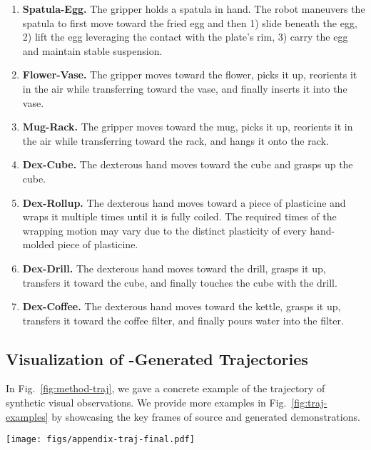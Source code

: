 \label{sec:appendix-task-real}
\begin{enumerate}
    \item \textbf{Spatula-Egg.} The gripper holds a spatula in hand. The robot maneuvers the spatula to first \textcolor{myorange}{move} toward the fried egg and then 1) \textcolor{myblue}{slide} beneath the egg, 2) \textcolor{myblue}{lift} the egg leveraging the contact with the plate's rim, 3) \textcolor{myblue}{carry} the egg and maintain stable suspension.
    \item \textbf{Flower-Vase.} The gripper \textcolor{myorange}{moves} toward the flower, \textcolor{myblue}{picks} it up, \textcolor{myorange}{reorients} it in the air while \textcolor{myorange}{transferring} toward the vase, and finally \textcolor{myblue}{inserts} it into the vase.
    \item \textbf{Mug-Rack.} The gripper \textcolor{myorange}{moves} toward the mug, \textcolor{myblue}{picks} it up, \textcolor{myorange}{reorients} it in the air while \textcolor{myorange}{transferring} toward the rack, and \textcolor{myblue}{hangs} it onto the rack.
    \item \textbf{Dex-Cube.} The dexterous hand \textcolor{myorange}{moves} toward the cube and \textcolor{myblue}{grasps} up the cube.
    \item \textbf{Dex-Rollup.} The dexterous hand \textcolor{myorange}{moves} toward a piece of plasticine and \textcolor{myblue}{wraps} it multiple times until it is fully coiled. The required times of the wrapping motion may vary due to the distinct plasticity of every hand-molded piece of plasticine.
    \item \textbf{Dex-Drill.} The dexterous hand \textcolor{myorange}{moves} toward the drill, \textcolor{myblue}{grasps} it up, \textcolor{myorange}{transfers} it toward the cube, and finally \textcolor{myblue}{touches} the cube with the drill. 
    \item \textbf{Dex-Coffee.} The dexterous hand \textcolor{myorange}{moves} toward the kettle, \textcolor{myblue}{grasps} it up, \textcolor{myorange}{transfers} it toward the coffee filter, and finally \textcolor{myblue}{pours} water into the filter.
\end{enumerate}

\subsection{Visualization of \method-Generated Trajectories}
\label{sec:appendix-vis-traj}
In Fig.~\ref{fig:method-traj}, we gave a concrete example of the trajectory of synthetic visual observations. We provide more examples in Fig.~\ref{fig:traj-examples} by showcasing the key frames of source and generated demonstrations.








\begin{figure*}
    \centering
    \texttt{[image: figs/appendix-traj-final.pdf]}
    \caption{\textbf{More examples of the trajectories consisting of synthetic visual observations.} }
    \label{fig:traj-examples}
\end{figure*}